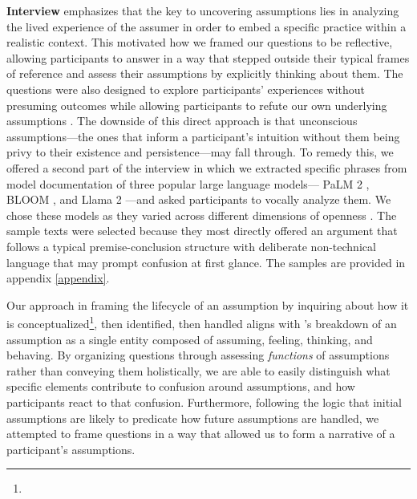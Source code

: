 \smallskip
\noindent \textbf{Interview } \citet{brookfield1992uncovering} emphasizes that the key to uncovering assumptions lies in analyzing the lived experience of the assumer in order to embed a specific practice within a realistic context. This motivated how we framed our questions to be reflective, allowing participants to answer in a way that stepped outside their typical frames of reference and assess their assumptions by explicitly thinking about them. The questions were also designed to explore participants' experiences without presuming outcomes while allowing participants to refute our own underlying assumptions \cite{kvale2009interviews}. The downside of this direct approach is that unconscious assumptions---the ones that inform a participant's intuition without them being privy to their existence and persistence---may fall through. 
To remedy this, we offered a second part of the interview in which we extracted specific phrases from model documentation of three popular large language models--- PaLM 2 \cite{anil2023palm}, BLOOM \cite{le2023bloom}, and Llama 2 \cite{touvron2023llama}---and asked participants to vocally analyze them. We chose these models as they varied across different dimensions of openness \cite{liesenfeld2024rethinking}. The sample texts were selected because they most directly offered an argument that follows a typical premise-conclusion structure with deliberate non-technical language that may prompt confusion at first glance. The samples are provided in appendix \ref{appendix}.

Our approach in framing the lifecycle of an assumption by inquiring about how it is conceptualized\footnote{}, then identified, then handled aligns with \citet{berman2001opening}'s breakdown of an assumption as a single entity composed of assuming, feeling, thinking, and behaving. By organizing questions through assessing \textit{functions} of assumptions rather than conveying them holistically, we are able to easily distinguish what specific elements contribute to confusion around assumptions, and how participants react to that confusion. Furthermore, following the logic that initial assumptions are likely to predicate how future assumptions are handled, we attempted to frame questions in a way that allowed us to form a narrative of a participant's assumptions.

